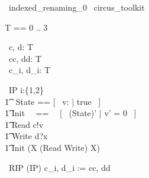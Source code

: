 \begin{zsection}
  \SECTION\ indexed\_renaming\_0 \parents\ circus\_toolkit
\end{zsection}

\begin{zed}
	T == 0 .. 3 
\end{zed}

\begin{circus}
	\circchannel\ c, d: T \\
	\circchannel\ cc, dd: T \cross \nat \\
	\circchannel\ c\_i, d\_i: T \cross \nat \\
\end{circus}

\begin{circus}
    \circprocess\ IP \circdef i:\{1,2\} \circindex \circbegin \\
        \t1 \circstate\ State == [~ v: \nat | true ~] \\
        \t1 Init ~~==~~ [~ (State)' | v' = 0 ~] \\
        \t1 Read \circdef c!v \then \Skip \\
        \t1 Write \circdef d?x \then \Skip \\
        \t1 \circspot \lschexpract Init \rschexpract \circseq (\circmu X \circspot (Read \extchoice Write) \circseq X) \\ 
	\circend
\end{circus}

\begin{circus}
    \circprocess\ RIP \circdef (IP) \lcircrename c\_i, d\_i := cc, dd \rcircrename \\
\end{circus}

%
% 

